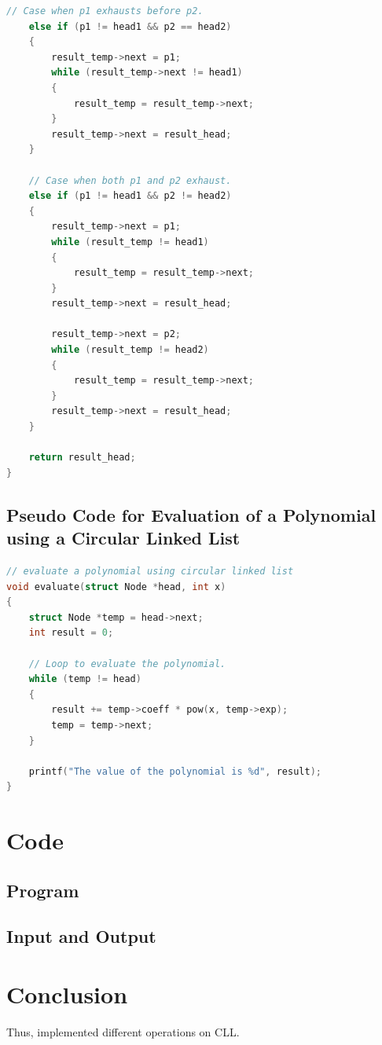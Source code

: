 \documentclass[11pt]{article}
\begin{document}
\begin{lstlisting}[language=C]
	// Case when p1 exhausts before p2.
	else if (p1 != head1 && p2 == head2)
	{
		result_temp->next = p1;
		while (result_temp->next != head1)
		{
			result_temp = result_temp->next;
		}
		result_temp->next = result_head;
	}

	// Case when both p1 and p2 exhaust.
	else if (p1 != head1 && p2 != head2)
	{
		result_temp->next = p1;
		while (result_temp != head1)
		{
			result_temp = result_temp->next;
		}
		result_temp->next = result_head;

		result_temp->next = p2;
		while (result_temp != head2)
		{
			result_temp = result_temp->next;
		}
		result_temp->next = result_head;
	}

	return result_head;
}

\end{lstlisting}
\subsection{Pseudo Code for Evaluation of a Polynomial using a Circular Linked List}

\begin{lstlisting}[language=C]
// evaluate a polynomial using circular linked list
void evaluate(struct Node *head, int x)
{
	struct Node *temp = head->next;
	int result = 0;
	
	// Loop to evaluate the polynomial.
	while (temp != head)
	{
		result += temp->coeff * pow(x, temp->exp);
		temp = temp->next;
	}
	
	printf("The value of the polynomial is %d", result);
}
\end{lstlisting}


\section{Code}

\subsection{Program}


\subsection{Input and Output}


\section{Conclusion}
Thus, implemented different operations on CLL.
\clearpage
\end{document}
